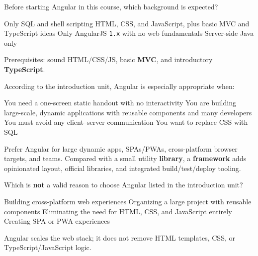 \question[4]
Before starting Angular in this course, which background is expected?
\begin{choices}
  \choice Only SQL and shell scripting
  \CorrectChoice HTML, CSS, and JavaScript, plus basic MVC and TypeScript ideas
  \choice Only AngularJS \texttt{1.x} with no web fundamentals
  \choice Server-side Java only
\end{choices}
\begin{solution}
  Prerequisites: sound HTML/CSS/JS, basic \textbf{MVC}, and introductory \textbf{TypeScript}.
\end{solution}

\question[4]
According to the introduction unit, Angular is especially appropriate when:
\begin{choices}
  \choice You need a one-screen static handout with no interactivity
  \CorrectChoice You are building large-scale, dynamic applications with reusable components and many developers
  \choice You must avoid any client--server communication
  \choice You want to replace CSS with SQL
\end{choices}
\begin{solution}
  Prefer Angular for large dynamic apps, SPAs/PWAs, cross-platform browser targets, and teams. Compared with a small utility \textbf{library}, a \textbf{framework} adds opinionated layout, official libraries, and integrated build/test/deploy tooling.
\end{solution}

\question[4]
Which is \textbf{not} a valid reason to choose Angular listed in the introduction unit?
\begin{choices}
  \choice Building cross-platform web experiences
  \choice Organizing a large project with reusable components
  \CorrectChoice Eliminating the need for HTML, CSS, and JavaScript entirely
  \choice Creating SPA or PWA experiences
\end{choices}
\begin{solution}
  Angular scales the web stack; it does not remove HTML templates, CSS, or TypeScript/JavaScript logic.
\end{solution}

